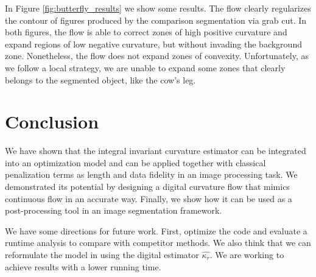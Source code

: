 \documentclass[runningheads]{llncs}
\begin{document}
        In Figure \ref{fig:butterfly_results} we show some results. The flow clearly regularizes the contour of figures
        produced by the comparison segmentation via grab cut. In both figures, the flow is able to correct zones of high positive
        curvature and expand regions of low negative curvature, but without invading the background zone. Nonetheless,
        the flow does not expand zones of convexity. Unfortunately, as we follow a local strategy, we are unable to expand
        some zones that clearly belongs to the segmented object, like the cow's leg.

\section{Conclusion}
We have shown that the integral invariant curvature estimator can be integrated into an optimization model and can be
applied together with classical penalization terms as length and data fidelity in an image processing task. We
demonstrated its potential by designing a digital curvature flow that mimics continuous flow in an accurate way. Finally, we show how it can be used as a post-processing tool in an image segmentation framework.

We have some directions for future work. First, optimize the code and evaluate a runtime analysis to compare with
competitor methods. We also think that we can reformulate the model in \cite{schoenemann09} using the digital estimator
$\hat{\kappa_r}$. We are working to achieve results with a lower running time.
	
\end{document}
